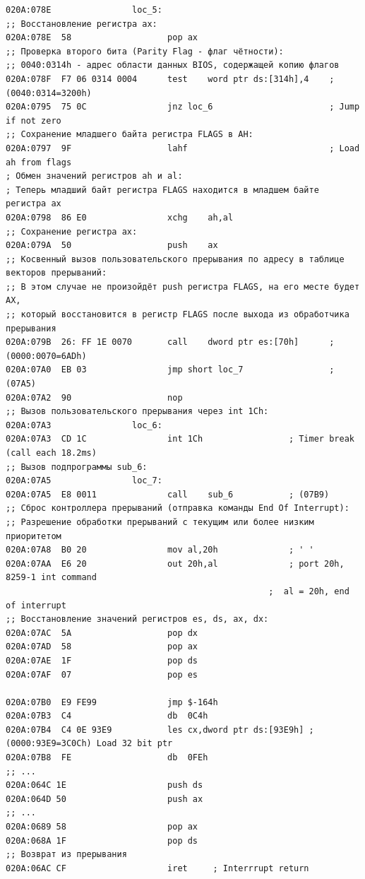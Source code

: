 \documentclass[a4paper,14pt]{article}
\begin{document}
\begin{lstlisting}[style={asm}]
020A:078E				 loc_5:
;; Восстановление регистра ax:
020A:078E  58					pop	ax
;; Проверка второго бита (Parity Flag - флаг чётности):
;; 0040:0314h - адрес области данных BIOS, содержащей копию флагов
020A:078F  F7 06 0314 0004		test	word ptr ds:[314h],4	; (0040:0314=3200h)
020A:0795  75 0C				jnz	loc_6						; Jump if not zero
;; Сохранение младшего байта регистра FLAGS в AH:
020A:0797  9F					lahf							; Load ah from flags
; Обмен значений регистров ah и al:
; Теперь младший байт регистра FLAGS находится в младшем байте регистра ax
020A:0798  86 E0				xchg	ah,al
;; Сохранение регистра ax:
020A:079A  50					push	ax
;; Косвенный вызов пользовательского прерывания по адресу в таблице векторов прерываний:
;; В этом случае не произойдёт push регистра FLAGS, на его месте будет AX,
;; который восстановится в регистр FLAGS после выхода из обработчика прерывания
020A:079B  26: FF 1E 0070		call	dword ptr es:[70h]		; (0000:0070=6ADh)
020A:07A0  EB 03				jmp	short loc_7					; (07A5)
020A:07A2  90					nop
;; Вызов пользовательского прерывания через int 1Ch:
020A:07A3				 loc_6:
020A:07A3  CD 1C				int	1Ch					; Timer break (call each 18.2ms)
;; Вызов подпрограммы sub_6:
020A:07A5				 loc_7:
020A:07A5  E8 0011				call	sub_6			; (07B9)
;; Сброс контроллера прерываний (отправка команды End Of Interrupt):
;; Разрешение обработки прерываний с текущим или более низким приоритетом
020A:07A8  B0 20				mov	al,20h				; ' '
020A:07AA  E6 20				out	20h,al				; port 20h, 8259-1 int command
													;  al = 20h, end of interrupt
;; Восстановление значений регистров es, ds, ax, dx:
020A:07AC  5A					pop	dx
020A:07AD  58					pop	ax
020A:07AE  1F					pop	ds
020A:07AF  07					pop	es

020A:07B0  E9 FE99				jmp	$-164h
020A:07B3  C4					db	0C4h
020A:07B4  C4 0E 93E9			les	cx,dword ptr ds:[93E9h]	; (0000:93E9=3C0Ch) Load 32 bit ptr
020A:07B8  FE					db	0FEh
;; ...
020A:064C 1E   					push ds
020A:064D 50					push ax
;; ...
020A:0689 58 					pop ax
020A:068A 1F  					pop ds
;; Возврат из прерывания
020A:06AC CF					iret     ; Interrrupt return
\end{lstlisting}
\clearpage
\end{document}
